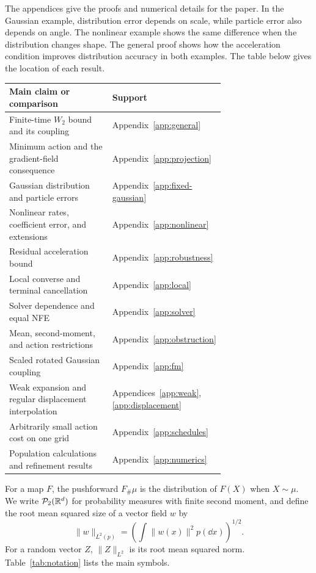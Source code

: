 The appendices give the proofs and numerical details for the paper. In the Gaussian example, distribution error depends on scale, while particle error also depends on angle. The nonlinear example shows the same difference when the distribution changes shape. The general proof shows how the acceleration condition improves distribution accuracy in both examples. The table below gives the location of each result.

\begin{center}
\begin{tabular}{p{0.70\linewidth}l}
\toprule
Main claim or comparison & Support\\
\midrule
Finite-time $W_2$ bound and its coupling & Appendix~\ref{app:general}\\
Minimum action and the gradient-field consequence & Appendix~\ref{app:projection}\\
Gaussian distribution and particle errors & Appendix~\ref{app:fixed-gaussian}\\
Nonlinear rates, coefficient error, and extensions & Appendix~\ref{app:nonlinear}\\
Residual acceleration bound & Appendix~\ref{app:robustness}\\
Local converse and terminal cancellation & Appendix~\ref{app:local}\\
Solver dependence and equal NFE & Appendix~\ref{app:solver}\\
Mean, second-moment, and action restrictions & Appendix~\ref{app:obstruction}\\
Scaled rotated Gaussian coupling & Appendix~\ref{app:fm}\\
Weak expansion and regular displacement interpolation & Appendices~\ref{app:weak}, \ref{app:displacement}\\
Arbitrarily small action cost on one grid & Appendix~\ref{app:schedules}\\
Population calculations and refinement results & Appendix~\ref{app:numerics}\\
\bottomrule
\end{tabular}
\end{center}

For a map $F$, the pushforward $F_\#\mu$ is the distribution of $F(X)$ when $X\sim\mu$. We write $\mathcal P_2(\mathbb R^d)$ for probability measures with finite second moment, and define the root mean squared size of a vector field $w$ by
\[
 \|w\|_{L^2(p)}=\left(\int \|w(x)\|^2p(\dd x)\right)^{1/2}.
\]
For a random vector $Z$, $\|Z\|_{L^2}$ is its root mean squared norm. Table~\ref{tab:notation} lists the main symbols.

